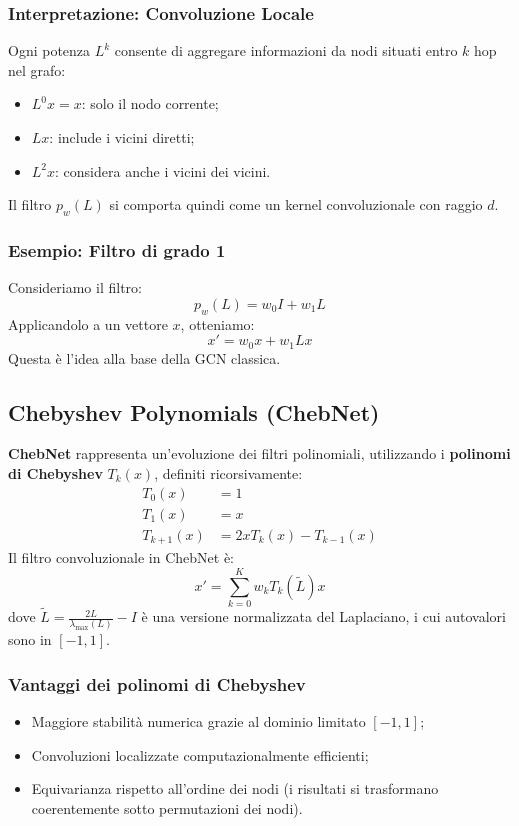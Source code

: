 \subsubsection{Interpretazione: Convoluzione Locale}

Ogni potenza \( L^k \) consente di aggregare informazioni da nodi situati entro \( k \) hop nel grafo:
\begin{itemize}
  \item \( L^0 x = x \): solo il nodo corrente;
  \item \( Lx \): include i vicini diretti;
  \item \( L^2 x \): considera anche i vicini dei vicini.
\end{itemize}
Il filtro \( p_w(L) \) si comporta quindi come un kernel convoluzionale con raggio \( d \).

\subsubsection{Esempio: Filtro di grado 1}
Consideriamo il filtro:
\[
  p_w(L) = w_0 I + w_1 L
\]
Applicandolo a un vettore \( x \), otteniamo:
\[
  x' = w_0 x + w_1 Lx
\]
Questa è l’idea alla base della GCN classica.

\subsection{Chebyshev Polynomials (ChebNet)}

\textbf{ChebNet} rappresenta un’evoluzione dei filtri polinomiali, utilizzando i \textbf{polinomi di Chebyshev} \( T_k(x) \), definiti ricorsivamente:
\[
\begin{aligned}
  T_0(x) &= 1 \\
  T_1(x) &= x \\
  T_{k+1}(x) &= 2x T_k(x) - T_{k-1}(x)
\end{aligned}
\]
Il filtro convoluzionale in ChebNet è:
\[
  x' = \sum_{k=0}^K w_k T_k(\tilde{L}) x
\]
dove \( \tilde{L} = \frac{2L}{\lambda_{\text{max}}(L)} - I \) è una versione normalizzata del Laplaciano, i cui autovalori sono in \([-1, 1]\).

\subsubsection{Vantaggi dei polinomi di Chebyshev}

\begin{itemize}
  \item Maggiore stabilità numerica grazie al dominio limitato \([-1, 1]\);
  \item Convoluzioni localizzate computazionalmente efficienti;
  \item Equivarianza rispetto all’ordine dei nodi (i risultati si trasformano coerentemente sotto permutazioni dei nodi).
\end{itemize}

